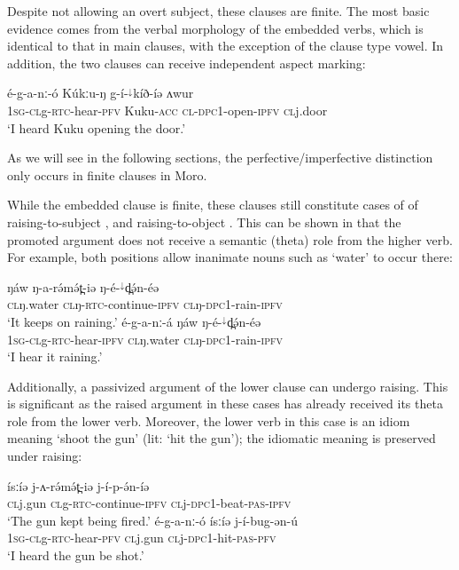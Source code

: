 Despite not allowing an overt subject, these clauses are finite. The most basic evidence comes from the verbal morphology of the embedded verbs, which is identical to that in main clauses, with the exception of the clause type vowel. In addition, the two clauses can receive independent aspect marking:

\ea \gll é-g-a-nː-ó Kúkːu-ŋ g-í-$^{↓}$kíð-íə ʌwur\\
1\textsc{sg}-\textsc{cl}g-\textsc{rtc}-hear-\textsc{pfv} Kuku-\textsc{acc} \textsc{cl}-\textsc{dpc1}-open-\textsc{ipfv} \textsc{cl}j.door\\
\glt `I heard Kuku opening the door.'
\z 

As we will see in the following sections, the perfective/imperfective distinction only occurs in finite clauses in Moro.

While the embedded clause is finite, these clauses still constitute cases of of raising-to-subject , and raising-to-object .  This can be shown in that the promoted argument does not receive a semantic (theta) role from the higher verb. For example, both positions allow inanimate nouns such as `water' to occur there:

\ea 
\ea  \gll  ŋáw ŋ-a-rə́mə́t̪-iə ŋ-é-$^{↓}$d̪ə́n-éə\\
\textsc{cl}ŋ.water \textsc{cl}ŋ-\textsc{rtc}-continue-\textsc{ipfv} \textsc{cl}ŋ-\textsc{dpc1}-rain-\textsc{ipfv}\\
\glt `It keeps on raining.'
\ex  \gll  é-g-a-nː-á ŋáw ŋ-é-$^{↓}$d̪ə́n-éə\\
1\textsc{sg}-\textsc{cl}g-\textsc{rtc}-hear-\textsc{ipfv} \textsc{cl}ŋ.water \textsc{cl}ŋ-\textsc{dpc1}-rain-\textsc{ipfv}\\
\glt `I hear it raining.'
 \z 
 \z 
 
Additionally, a passivized argument of the lower clause can undergo raising. This is significant as the raised argument in these cases has already received its theta role from the lower verb. Moreover, the lower verb in this case is an idiom meaning `shoot the gun' (lit: `hit the gun'); the idiomatic meaning is preserved under raising:

\ea 
\ea  \gll  ísːíə j-ʌ-rə́mə́t̪-iə j-í-p-ə́n-íə \\
\textsc{cl}j.gun \textsc{cl}g-\textsc{rtc}-continue-\textsc{ipfv} \textsc{cl}j-\textsc{dpc1}-beat-\textsc{pas}-\textsc{ipfv}\\
\glt `The gun kept being fired.'
\ex  \gll  é-g-a-nː-ó ísːíə j-í-bug-ən-ú\\
1\textsc{sg}-\textsc{cl}g-\textsc{rtc}-hear-\textsc{pfv} \textsc{cl}j.gun \textsc{cl}j-\textsc{dpc1}-hit-\textsc{pas}-\textsc{pfv}\\
\glt  `I heard the gun be shot.'
\z
\z 

